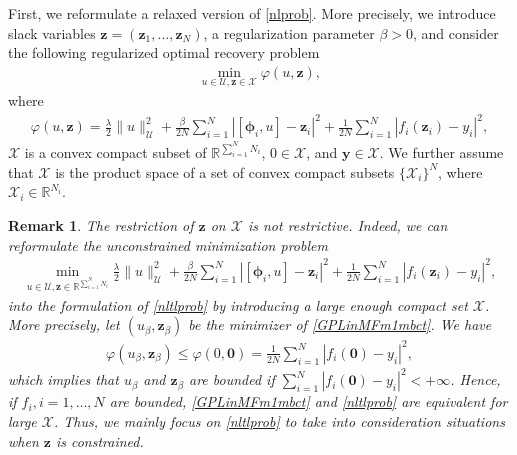 \documentclass[10pt,reqno]{amsart}
\newcommand{\1}{{\chi}}
\def\leq{\leqslant}
\numberwithin{equation}{section}
\theoremstyle{thmlemcorr}
\numberwithin{theorem}{section}
\theoremstyle{thmlemcorr*}
\theoremstyle{defi}
\theoremstyle{remexample}
\newtheorem{remark}[theorem]{Remark}
\theoremstyle{ass}
\begin{document}
First, we reformulate a relaxed version of \eqref{nlprob}. More precisely, we introduce slack variables $\boldsymbol{z}=(\boldsymbol{z}_1,\dots,\boldsymbol{z}_N)$, a regularization parameter $\beta>0$, and consider the following regularized optimal recovery problem
\begin{align}
	\label{nltlprob}
	\min_{u\in \mathcal{U}, \boldsymbol{z}\in \mathcal{X}}\varphi(u, \boldsymbol{z}), 
\end{align}
where
\begin{align}
	\label{nldefvph}
	\varphi(u, \boldsymbol{z}) = \frac{\lambda}{2}\|u\|_{\mathcal{U}}^2 + \frac{\beta}{2N}\sum_{i=1}^N|[\boldsymbol{\phi}_i, u]-\boldsymbol{z}_i|^2 + \frac{1}{2N}\sum_{i=1}^N|f_i(\boldsymbol{z}_i)-{y}_i|^2,
\end{align}
$\mathcal{X}$ is a convex compact subset of $\mathbb{R}^{\sum_{i=1}^NN_i}$, $0\in \mathcal{X}$, and $\boldsymbol{y}\in \mathcal{X}$. We further assume that $\mathcal{X}$ is the product space of a set of convex compact subsets $\{\mathcal{X}_i\}^N$, where $\mathcal{X}_i\in \mathbb{R}^{N_i}$.  
\begin{remark}
	\label{rmklubdmnp}
	The restriction of $\boldsymbol{z}$ on $\mathcal{X}$ is not restrictive. Indeed, we can reformulate the unconstrained minimization problem
	\begin{align}
		\label{GPLinMFm1mbct}
		\min_{u\in \mathcal{U}, \boldsymbol{z}\in \mathbb{R}^{\sum_{i=1}^NN_i}}\frac{\lambda}{2}\|u\|_{\mathcal{U}}^2 + \frac{\beta}{2N}\sum_{i=1}^N|[\boldsymbol{\phi}_i, u]-\boldsymbol{z}_i|^2 + \frac{1}{2N}\sum_{i=1}^N|f_i(\boldsymbol{z}_i)-{y}_i|^2, 
	\end{align}
	into the formulation of \eqref{nltlprob} by introducing a large enough compact set $\mathcal{X}$. More precisely, let $(u_\beta, \boldsymbol{z}_\beta)$ be the minimizer of \eqref{GPLinMFm1mbct}. We have 
	\begin{align*}
		\varphi(u_{\beta}, \boldsymbol{z}_\beta) \leq \varphi(0, \boldsymbol{0}) = \frac{1}{2N}\sum_{i=1}^N|f_i(\boldsymbol{0}) - y_i|^2,
	\end{align*}
	which implies that $u_\beta$ and $\boldsymbol{z}_\beta$ are bounded if $\sum_{i=1}^N|f_i(\boldsymbol{0})-y_i|^2<+\infty$. Hence, if $f_i, i=1,\dots, N$ are bounded,  \eqref{GPLinMFm1mbct} and \eqref{nltlprob} are equivalent for large  $\mathcal{X}$. Thus, we mainly focus on \eqref{nltlprob} to take into consideration   situations when $\boldsymbol{z}$ is constrained. 
	
\end{remark}
\end{document}
